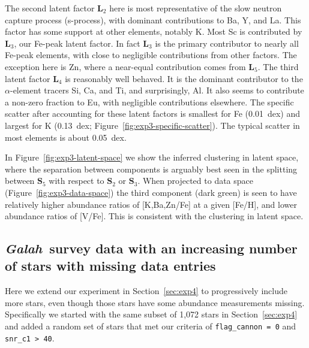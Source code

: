 \documentclass[twocolumn]{aastex62}
\newcommand{\project}[1]{\textsl{#1}}
\newcommand{\Galah}{\project{Galah}}
\newcommand{\factorloads}{\textbf{L}}
\newcommand{\factorscores}{\textbf{S}}
\begin{document}
The second latent factor $\mathbf{L}_2$ here is most representative of the slow neutron capture process (s-process), with dominant contributions to Ba, Y, and La. This factor has some support at other elements, notably K. Most Sc is contributed by $\mathbf{L}_3$, our Fe-peak latent factor. In fact $\mathbf{L}_3$ is the primary contributor to nearly all Fe-peak elements, with close to negligible contributions from other factors. The exception here is Zn, where a near-equal contribution comes from $\mathbf{L}_5$.
The third latent factor $\mathbf{L}_4$ is reasonably well behaved. It is the dominant contributor to the $\alpha$-element tracers Si, Ca, and Ti, and surprisingly, Al. It also seems to contribute a non-zero fraction to Eu, with negligible contributions elsewhere.
The specific scatter after accounting for these latent factors is smallest
for Fe (0.01~dex) and largest for K (0.13~dex; Figure~\ref{fig:exp3-specific-scatter}). The typical scatter in most elements is about 0.05~dex.

In Figure~\ref{fig:exp3-latent-space} we show the inferred clustering in latent space,
where the separation between components is arguably best seen in the splitting between $\factorscores_5$ with respect to $\factorscores_2$ or $\factorscores_3$. When projected to data space (Figure~\ref{fig:exp3-data-space}) the third component (dark green) is seen to have relatively higher abundance ratios of [K,Ba,Zn/Fe] at a given [Fe/H],
and lower abundance ratios of [V/Fe]. This is consistent with the clustering in latent space.%


\subsection{\Galah\ survey data with an increasing number of stars with missing data entries} \label{sec:exp10}
Here we extend our experiment in Section~\ref{sec:exp4} to progressively
include more stars, even though those stars have some abundance measurements
missing. 
Specifically we started with the same subset of 1,072 stars in Section~\ref{sec:exp4}
and added a random set of stars that met our criteria of \texttt{flag\_cannon = 0} and
\texttt{snr\_c1 > 40}. 
\end{document}
